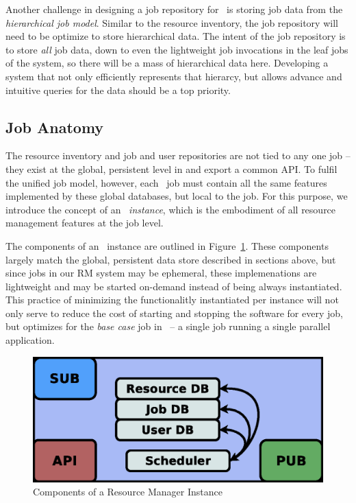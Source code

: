 Another challenge in designing a job repository for \ngrm\ is
storing job data from the \emph{hierarchical job model}. Similar
to the resource inventory, the job repository will need to be
optimize to store hierarchical data. The intent of the job
repository is to store \emph{all} job data, down to even the
lightweight job invocations in the leaf jobs of the system,
so there will be a mass of hierarchical data here. Developing
a system that not only efficiently represents that hierarcy,
but allows advance and intuitive queries for the data should
be a top priority.

\subsection{Job Anatomy}

The resource inventory and job and user repositories are
not tied to any one job -- they exist at the global, persistent
level in \ngrm and export a common API.  To fulfil the unified
job model, however, each \ngrm\ job must contain all the
same features implemented by these global databases, but local
to the job. For this purpose, we introduce the concept of
an \ngrm\ \emph{instance}, which is the embodiment of all
resource management features at the job level.

The components of an \ngrm\ instance are outlined in
Figure~\ref{fig:rminstance}.  These components largely match the
global, persistent data store described in sections above, but since
jobs in our RM system may be ephemeral, these implemenations are
lightweight and may be started on-demand instead of being always
instantiated. This practice of minimizing the functionalitly
instantiated per instance will not only serve to reduce the cost
of starting and stopping the software for every job, but optimizes
for the \emph{base case} job in \ngrm\ -- a single job running a
single parallel application.

\begin{figure}
\centering
\includegraphics[scale=0.30]{../fig/RM-instance.eps}
\caption{Components of a Resource Manager Instance}
\label{fig:rminstance}
\end{figure}

